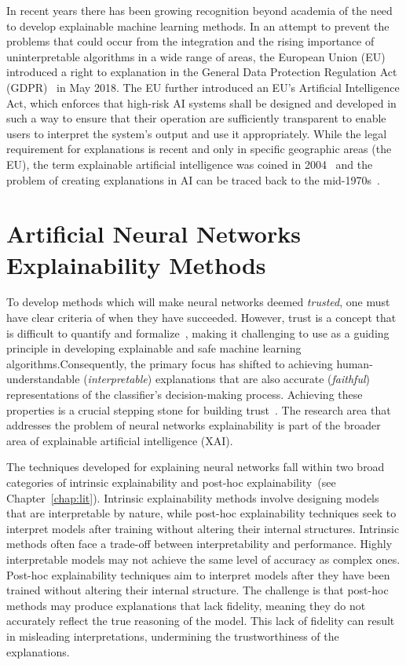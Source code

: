 In recent years there has been growing recognition beyond academia of the need to develop explainable machine learning methods. In an attempt to prevent the problems that could occur from the integration and the rising importance of uninterpretable algorithms in a wide range of areas, the European Union (EU) introduced a right to explanation in the General Data Protection Regulation Act (GDPR)~\cite{GoodmanF17} in May 2018. The EU further introduced an EU’s Artificial Intelligence Act, which enforces that high-risk AI systems shall be designed and developed in such a way to ensure that their operation are sufficiently transparent to enable users to interpret the system’s output and use it appropriately. While the legal requirement for explanations is recent and only in specific geographic areas (the EU), the term explainable artificial intelligence was coined in 2004~\cite{LentFM04} and the problem of creating explanations in AI can be traced back to the mid-1970s~\cite{moore1988explanation}. 

\section{ Artificial Neural Networks Explainability Methods}

To develop methods which will make neural networks deemed \emph{trusted}, one must have clear criteria of when they have succeeded. However, trust is a concept that is difficult to quantify and formalize~\cite{doshi2017towards, Lipton18}, making it challenging to use as a guiding principle in developing explainable and safe machine learning algorithms.Consequently, the primary focus has shifted to achieving human-understandable (\textit{interpretable}) explanations that are also accurate (\textit{faithful}) representations of the classifier's decision-making process. Achieving these properties is a crucial stepping stone for building trust~\cite{Lipton18}. The research area that addresses the problem of neural networks explainability is part of the broader area of explainable artificial intelligence (XAI).

The techniques developed for explaining neural networks fall within two broad categories of intrinsic explainability and post-hoc explainability~\cite{ArrietaRSBTBGGM20, DuLH20, IbrahimS23}(see Chapter~\ref{chap:lit}). Intrinsic explainability methods involve designing models that are interpretable by nature, while post-hoc explainability techniques seek to interpret models after training without altering their internal structures. Intrinsic methods often face a trade-off between interpretability and performance. Highly interpretable models may not achieve the same level of accuracy as complex ones. Post-hoc explainability techniques aim to interpret models after they have been trained without altering their internal structure. The challenge is that post-hoc methods may produce explanations that lack fidelity, meaning they do not accurately reflect the true reasoning of the model. This lack of fidelity can result in misleading interpretations, undermining the trustworthiness of the explanations.

